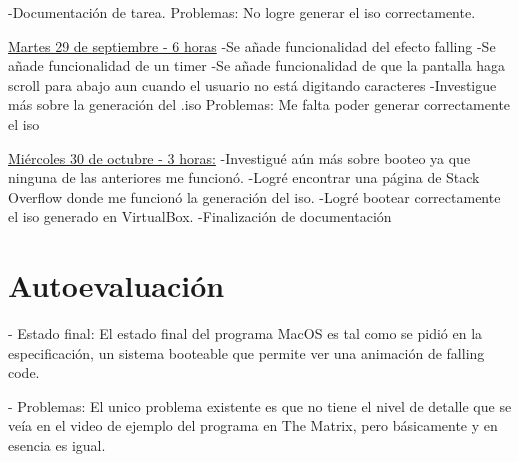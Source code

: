 \documentclass{report}
\begin{document}
{{-Documentación de tarea.\newline
\newline
Problemas:
No logre generar el iso correctamente.
\newline
\newline
{\underline {Martes 29 de septiembre - 6 horas}
\newline
-Se añade funcionalidad del efecto falling\newline
-Se añade funcionalidad de un timer\newline
-Se añade funcionalidad de que la pantalla haga scroll para abajo aun cuando el usuario no está digitando caracteres\newline
-Investigue más sobre la generación del .iso \newline
\newline
\newline
Problemas:
Me falta poder generar correctamente el iso
\newline
\newline
\newline
{\underline {Miércoles 30 de octubre - 3 horas:}
\newline
-Investigué aún más sobre booteo ya que ninguna de las anteriores me funcionó.\newline
-Logré encontrar una página de Stack Overflow donde me funcionó la generación del iso.\newline
-Logré bootear correctamente el iso generado en VirtualBox.\newline
-Finalizaci\'on de documentaci\'on\newline
\newline

\newpage
\section{Autoevaluaci\'on}
\newline
\newline
- Estado final: \newline
El estado final del programa MacOS es tal como se pidi\'o en la especificaci\'on, \newline
un sistema booteable que permite ver una animaci\'on de falling code.\newline

\newline
\newline

- Problemas:\newline
El unico problema existente es que no tiene el nivel de detalle que se ve\'ia en el 
video de ejemplo del programa en The Matrix, pero b\'asicamente y en esencia es igual. \newline

}}}}
\end{document}
